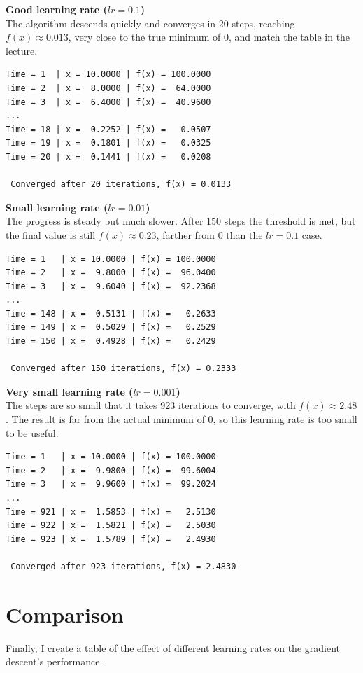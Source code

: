 \documentclass{article}
\begin{document}
\textbf{Good learning rate ($lr = 0.1$)}\\
The algorithm descends quickly and converges in 20 steps, reaching $f(x) \approx 0.013$, very close to the true minimum of 0, and match the table in the lecture.
 
\begin{verbatim}
Time = 1  | x = 10.0000 | f(x) = 100.0000
Time = 2  | x =  8.0000 | f(x) =  64.0000
Time = 3  | x =  6.4000 | f(x) =  40.9600
...
Time = 18 | x =  0.2252 | f(x) =   0.0507
Time = 19 | x =  0.1801 | f(x) =   0.0325
Time = 20 | x =  0.1441 | f(x) =   0.0208

 Converged after 20 iterations, f(x) = 0.0133
\end{verbatim}
\vspace{0.5em}

\textbf{Small learning rate ($lr = 0.01$)}\\
The progress is steady but much slower. After 150 steps the threshold is met, but the final value is still $f(x) \approx 0.23$, farther from 0 than the $lr = 0.1$ case.
 
\begin{verbatim}
Time = 1   | x = 10.0000 | f(x) = 100.0000
Time = 2   | x =  9.8000 | f(x) =  96.0400
Time = 3   | x =  9.6040 | f(x) =  92.2368
...
Time = 148 | x =  0.5131 | f(x) =   0.2633
Time = 149 | x =  0.5029 | f(x) =   0.2529
Time = 150 | x =  0.4928 | f(x) =   0.2429
 
 Converged after 150 iterations, f(x) = 0.2333
\end{verbatim}
 
\vspace{0.5em}
\textbf{Very small learning rate ($lr = 0.001$)} \\
The steps are so small that it takes 923 iterations to converge, with $f(x) \approx 2.48$. The result is far from the actual minimum of 0, so this learning rate is too small to be useful.
 
\begin{verbatim}
Time = 1   | x = 10.0000 | f(x) = 100.0000
Time = 2   | x =  9.9800 | f(x) =  99.6004
Time = 3   | x =  9.9600 | f(x) =  99.2024
...
Time = 921 | x =  1.5853 | f(x) =   2.5130
Time = 922 | x =  1.5821 | f(x) =   2.5030
Time = 923 | x =  1.5789 | f(x) =   2.4930
 
 Converged after 923 iterations, f(x) = 2.4830
\end{verbatim}

\section*{Comparison}
Finally, I create a table of the effect of different learning rates on the gradient descent's performance. 
\end{document}
